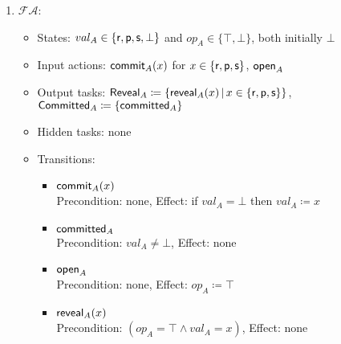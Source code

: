 \documentclass[10pt]{article}
\begin{document}
\begin{example}[$\RPSReal$]
\begin{enumerate}
\item $\mathcal{FA}$:
\begin{itemize}
\item States: $val_A \in \{\mathsf{r},\mathsf{p},\mathsf{s},\bot\}$ and $op_A \in \{\top,\bot\}$, both initially $\bot$
\item Input actions: $\mathsf{commit}_A(x)$ for $x \in \{\mathsf{r},\mathsf{p},\mathsf{s}\}$, $\mathsf{open}_A$
\item Output tasks: $\mathsf{Reveal}_A \coloneqq \{\mathsf{reveal}_A(x) \, | \, x \in \{\mathsf{r},\mathsf{p},\mathsf{s}\}\}$, $\mathsf{Committed}_A \coloneqq \{\mathsf{committed}_A\}$
\item Hidden tasks: none
\item Transitions:
\begin{itemize}
\item $\mathsf{commit}_A(x)$ \\
Precondition: none, Effect: if $val_A = \bot$ then $val_A \coloneqq x$
\item $\mathsf{committed}_A$ \\
Precondition: $val_A \neq \bot$, Effect: none
\item $\mathsf{open}_A$\\
Precondition: none, Effect: $op_A \coloneqq \top$
\item $\mathsf{reveal}_A(x)$\\
Precondition: $(op_A = \top \wedge val_A = x)$, Effect: none
\end{itemize}
\end{itemize}


\end{enumerate}
\end{example}
\end{document}
